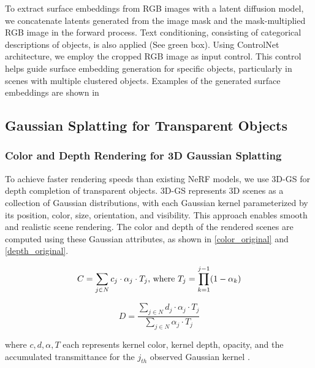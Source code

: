 To extract surface embeddings from RGB images with a latent diffusion model, we concatenate latents generated from the image mask and the mask-multiplied RGB image in the forward process. Text conditioning, consisting of categorical descriptions of objects, is also applied (See  green box). Using ControlNet \cite{zhang2023controlnet} architecture, we employ the cropped RGB image as input control. This control helps guide surface embedding generation for specific objects, particularly in scenes with multiple clustered objects. Examples of the generated surface embeddings are shown in   %



\subsection{Gaussian Splatting for Transparent Objects}

\subsubsection{Color and Depth Rendering for 3D Gaussian Splatting}

To achieve faster rendering speeds than existing \ac{NeRF} models, we use \ac{3D-GS} for depth completion of transparent objects. \ac{3D-GS} represents 3D scenes as a collection of Gaussian distributions, with each Gaussian kernel parameterized by its position, color, size, orientation, and visibility. This approach enables smooth and realistic scene rendering. The color and depth of the rendered scenes are computed using these Gaussian attributes, as shown in \eqref{color_original} and \eqref{depth_original}.
\vspace{-2mm}

\small
\begin{equation}
C = \sum_{j \in N} c_{j} \cdot \alpha_{j} \cdot T_j  \text{, where} \ T_{j} = \prod^{j-1}_{k=1} (1-\alpha_{k})
\label{color_original}
\vspace{-2mm}
\end{equation}

\begin{equation}
    D = \frac{\sum_{j \in N} d_{j} \cdot \alpha_{j} \cdot T_j}{\sum_{j \in N} \alpha_{j} \cdot T_j}
\label{depth_original}
\end{equation}


\normalsize
where $c, d, \alpha, T$ each represents kernel color, kernel depth, opacity, and the accumulated transmittance for the $j_{th}$ observed Gaussian kernel \cite{rendering_eq, yang2024deformable, matsuki2024gaussian}.

